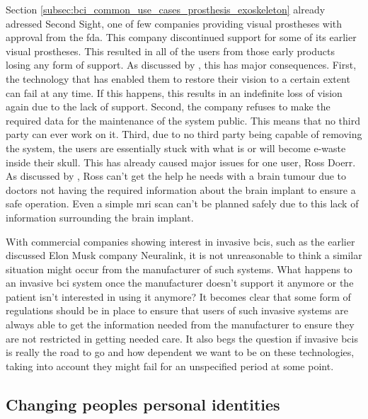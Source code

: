 Section \ref{subsec:bci_common_use_cases_prosthesis_exoskeleton} already adressed Second Sight, one of few companies providing visual prostheses with approval from the \gls{fda}.
This company discontinued support for some of its earlier visual prostheses.
This resulted in all of the users from those early products losing any form of support.
As discussed by \citet{second_sight_broken_ethics}, this has major consequences.
First, the technology that has enabled them to restore their vision to a certain extent can fail at any time.
If this happens, this results in an indefinite loss of vision again due to the lack of support.
Second, the company refuses to make the required data for the maintenance of the system public.
This means that no third party can ever work on it.
Third, due to no third party being capable of removing the system, the users are essentially stuck with what is or will become e-waste inside their skull.
This has already caused major issues for one user, Ross Doerr.
As discussed by \citet{second_sight_broken_ethics}, Ross can't get the help he needs with a brain tumour due to doctors not having the required information about the brain implant to ensure a safe operation.
Even a simple \gls{mri} scan can't be planned safely due to this lack of information surrounding the brain implant.

With commercial companies showing interest in invasive \glspl{bci}, such as the earlier discussed Elon Musk company Neuralink, it is not unreasonable to think a similar situation might occur from the manufacturer of such systems.
What happens to an invasive \gls{bci} system once the manufacturer doesn't support it anymore or the patient isn't interested in using it anymore?
It becomes clear that some form of regulations should be in place to ensure that users of such invasive systems are always able to get the information needed from the manufacturer to ensure they are not restricted in getting needed care.
It also begs the question if invasive \glspl{bci} is really the road to go and how dependent we want to be on these technologies, taking into account they might fail for an unspecified period at some point.


\subsection{Changing peoples personal identities}
\label{subsec:bci_ethical_identity}

